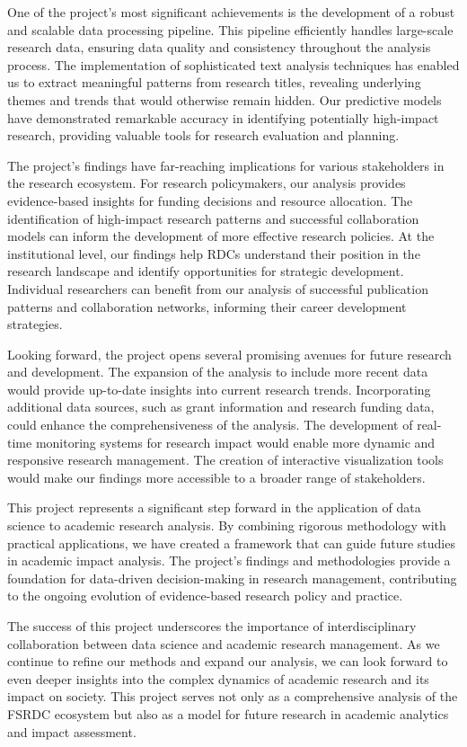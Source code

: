 \documentclass[12pt]{article}
\begin{document}
One of the project's most significant achievements is the development of a robust and scalable data processing pipeline. This pipeline efficiently handles large-scale research data, ensuring data quality and consistency throughout the analysis process. The implementation of sophisticated text analysis techniques has enabled us to extract meaningful patterns from research titles, revealing underlying themes and trends that would otherwise remain hidden. Our predictive models have demonstrated remarkable accuracy in identifying potentially high-impact research, providing valuable tools for research evaluation and planning.

The project's findings have far-reaching implications for various stakeholders in the research ecosystem. For research policymakers, our analysis provides evidence-based insights for funding decisions and resource allocation. The identification of high-impact research patterns and successful collaboration models can inform the development of more effective research policies. At the institutional level, our findings help RDCs understand their position in the research landscape and identify opportunities for strategic development. Individual researchers can benefit from our analysis of successful publication patterns and collaboration networks, informing their career development strategies.

Looking forward, the project opens several promising avenues for future research and development. The expansion of the analysis to include more recent data would provide up-to-date insights into current research trends. Incorporating additional data sources, such as grant information and research funding data, could enhance the comprehensiveness of the analysis. The development of real-time monitoring systems for research impact would enable more dynamic and responsive research management. The creation of interactive visualization tools would make our findings more accessible to a broader range of stakeholders.

This project represents a significant step forward in the application of data science to academic research analysis. By combining rigorous methodology with practical applications, we have created a framework that can guide future studies in academic impact analysis. The project's findings and methodologies provide a foundation for data-driven decision-making in research management, contributing to the ongoing evolution of evidence-based research policy and practice.

The success of this project underscores the importance of interdisciplinary collaboration between data science and academic research management. As we continue to refine our methods and expand our analysis, we can look forward to even deeper insights into the complex dynamics of academic research and its impact on society. This project serves not only as a comprehensive analysis of the FSRDC ecosystem but also as a model for future research in academic analytics and impact assessment.
\end{document}
